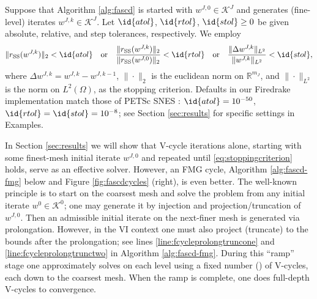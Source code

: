 \documentclass[review,hidelinks,onefignum,onetabnum,final]{siamart220329}  %
\newcommand{\RR}{\mathbb{R}}
\newcommand{\rSS}{r_{\text{SS}}}
\begin{document}
Suppose that Algorithm \ref{alg:fascd} is started with $w^{J,0} \in \mathcal{K}^J$ and generates (fine-level) iterates $w^{J,k} \in \mathcal{K}^J$.  Let $\id{atol}$, $\id{rtol}$, $\id{stol} \ge 0$ be given absolute, relative, and step tolerances, respectively.  We employ
\begin{equation}
\|\rSS(w^{J,k})\|_2 < \id{atol} \quad \text{or} \quad \frac{\|\rSS(w^{J,k})\|_2}{\|\rSS(w^{J,0})\|_2} < \id{rtol} \quad \text{or} \quad \frac{\|\Delta w^{J,k}\|_{L^2}}{\|w^{J,k}\|_{L^2}} < \id{stol}, \label{eq:stoppingcriterion}
\end{equation}
where $\Delta w^{J,k} = w^{J,k} -  w^{J,k-1}$, $\|\cdot\|_2$ is the euclidean norm on $\RR^{m_J}$, and $\|\cdot\|_{L^2}$ is the norm on $L^2(\Omega)$, as the stopping criterion.  Defaults in our Firedrake implementation match those of PETSc SNES \cite{Balayetal2023}: $\id{atol}=10^{-50}$, $\id{rtol}=\id{stol}=10^{-8}$; see Section \ref{sec:results} for specific settings in Examples.

In Section \ref{sec:results} we will show that V-cycle iterations alone, starting with some finest-mesh initial iterate $w^{J,0}$ and repeated until \eqref{eq:stoppingcriterion} holds, serve as an effective solver.  However, an FMG cycle, Algorithm \ref{alg:fascd-fmg} below and Figure \ref{fig:fascdcycles} (right), is even better.  The well-known principle \cite[section 2.6]{Trottenbergetal2001} is to start on the coarsest mesh and solve the problem from any initial iterate $w^0\in\mathcal{K}^0$; one may generate it by injection and projection/truncation of $w^{J,0}$.  Then an admissible initial iterate on the next-finer mesh is generated via prolongation.  However, in the VI context one must also project (truncate) to the bounds after the prolongation; see lines \ref{line:fcycleprolongtruncone} and \ref{line:fcycleprolongtrunctwo} in Algorithm \ref{alg:fascd-fmg}.  During this ``ramp'' stage one approximately solves on each level using a fixed number () of V-cycles, each down to the coarsest mesh.  When the ramp is complete, one does full-depth V-cycles to convergence.
\end{document}
